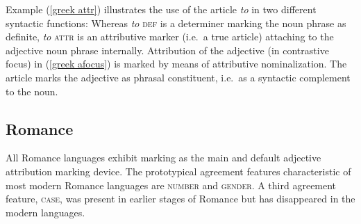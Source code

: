 Example (\ref{greek attr}) illustrates the use of the article \textit{to} in two different syntactic functions: Whereas \textit{to} \textsc{def} is a determiner marking the noun phrase as definite, \textit{to} \textsc{attr} is an attributive marker (i.e.~a true article) attaching to the adjective noun phrase internally. Attribution of the adjective (in contrastive focus) in (\ref{greek afocus}) is marked by means of attributive nominalization. The article marks the adjective as phrasal constituent, i.e.~as a syntactic complement to the noun.

\subsection{Romance}
All Romance languages exhibit  marking as the main and default adjective attribution marking device. The prototypical agreement features characteristic of most modern Romance languages are \textsc{number} and \textsc{gender}. A third agreement feature, \textsc{case}, was present in earlier stages of Romance but has disappeared in the modern languages.

